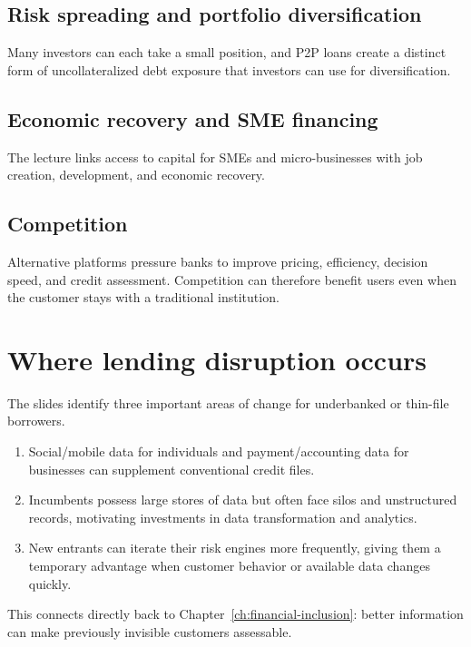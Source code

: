 \subsection{Risk spreading and portfolio diversification}

Many investors can each take a small position, and P2P loans create a distinct form of uncollateralized debt exposure that investors can use for diversification.

\subsection{Economic recovery and SME financing}

The lecture links access to capital for SMEs and micro-businesses with job creation, development, and economic recovery.

\subsection{Competition}

Alternative platforms pressure banks to improve pricing, efficiency, decision speed, and credit assessment. Competition can therefore benefit users even when the customer stays with a traditional institution.

\section{Where lending disruption occurs}

The slides identify three important areas of change for underbanked or thin-file borrowers.

\begin{enumerate}
  \item {} Social/mobile data for individuals and payment/accounting data for businesses can supplement conventional credit files.
  \item {} Incumbents possess large stores of data but often face silos and unstructured records, motivating investments in data transformation and analytics.
  \item {} New entrants can iterate their risk engines more frequently, giving them a temporary advantage when customer behavior or available data changes quickly.
\end{enumerate}

This connects directly back to Chapter~\ref{ch:financial-inclusion}: better information can make previously invisible customers assessable.

